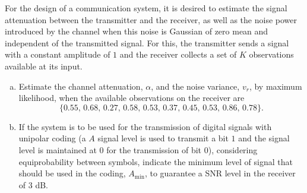 \begin{prob}
\label{ProbEstCanal}

For the design of a communication system, it is desired to estimate the signal attenuation between the transmitter and the receiver, as well as the noise power introduced by the channel when this noise is Gaussian of zero mean and independent of the transmitted signal. For this, the transmitter sends a signal with a constant amplitude of $1$ and the receiver collects a set of $K$ observations available at its input.

\begin{enumerate}[a)]
\item Estimate the channel attenuation, $\alpha$, and the noise variance, $v_r$, by maximum likelihood, when the available observations on the receiver are
$$
\{0.55,\, 0.68,\, 0.27,\, 0.58,\, 0.53,\, 0.37,\, 0.45,\, 0.53,\, 0.86,\, 0.78 \}. 
$$
\item If the system is to be used for the transmission of digital signals with unipolar coding (a $A$ signal level is used to transmit a bit $1$ and the signal level is maintained at $0$ for the transmission of bit $0$), considering equiprobability between symbols, indicate the minimum level of signal that should be used in the coding, $A_{\min}$, to guarantee a SNR level in the receiver of $3$ dB.
\end{enumerate}

\end{prob}

